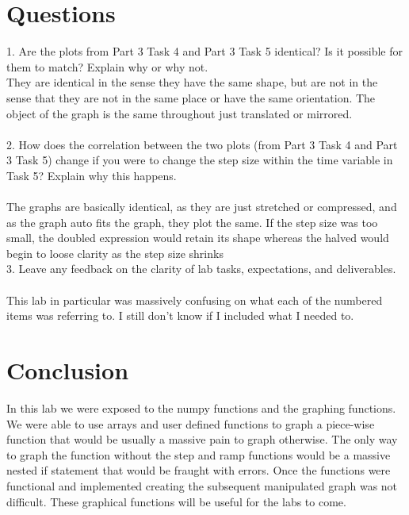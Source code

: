 \documentclass[12pt,a4paper]{article}
\begin{document}
\section{Questions}
1. Are the plots from Part 3 Task 4 and Part 3 Task 5 identical? Is it possible for them to
match? Explain why or why not. \\

They are identical in the sense they have the same shape, but are not in the sense that they are not in the same place or have the same orientation. The object of the graph is the same throughout just translated or mirrored. \\ 
\\
2. How does the correlation between the two plots (from Part 3 Task 4 and Part 3 Task 5)
change if you were to change the step size within the time variable in Task 5? Explain why
this happens.\\

\\
The graphs are basically identical, as they are just stretched or compressed, and as the graph auto fits the graph, they plot the same. If the step size was too small, the doubled expression would retain its shape whereas the halved would begin to loose clarity as the step size shrinks
\\
3. Leave any feedback on the clarity of lab tasks, expectations, and deliverables. \\
\\
This lab in particular was massively confusing on what each of the numbered items was referring to. I still don't know if  I included what I needed to. 

\section{Conclusion}
In this lab we were exposed to the numpy functions and the graphing functions. We were able to use arrays and user defined functions to graph a piece-wise function that would be usually a massive pain to graph otherwise. The only way to graph the function without the step and ramp functions would be a massive nested if statement that would be fraught with errors. Once the functions were functional and implemented creating the subsequent manipulated graph was not difficult. These graphical functions will be useful for the labs to come. 
\end{document}
